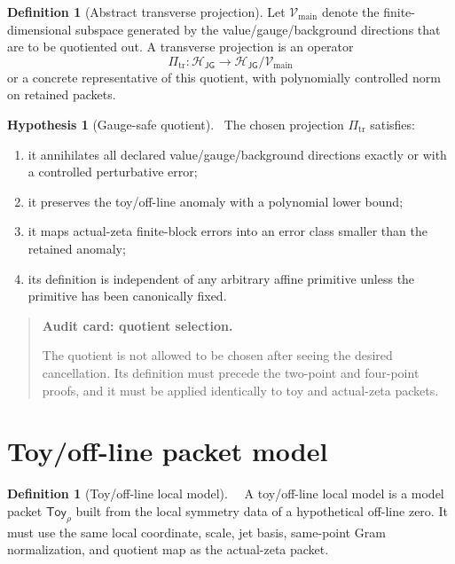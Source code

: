 \documentclass[11pt,a4paper]{amsart}
\newcommand{\Status}[1]{\textnormal{\fbox{\scriptsize\textsf{#1}}}}
\newcommand{\Core}{\Status{CORE}}
\newcommand{\Open}{\Status{OPEN}}
\newcommand{\JG}{\mathsf{JG}}
\newcommand{\Toy}{\mathsf{Toy}}
\newcommand{\trans}{\mathrm{tr}}
\newcommand{\main}{\mathrm{main}}
\theoremstyle{plain}
\theoremstyle{definition}
\newtheorem{definition}[theorem]{Definition}
\newtheorem{hypothesis}[theorem]{Hypothesis}
\newenvironment{audit}[1]{%
  \begin{quote}\noindent\textbf{Audit card: #1.}\par\smallskip\small
}{\end{quote}}
\begin{document}
\begin{definition}[Abstract transverse projection]
\label{def:abstract-transverse-projection}
Let \(\mathcal V_{\main}\) denote the finite-dimensional subspace generated by the value/gauge/background directions that are to be quotiented out.  A transverse projection is an operator
\[
        \Pi_{\trans}:\mathcal H_{\JG}\to \mathcal H_{\JG}/\mathcal V_{\main}
\]
or a concrete representative of this quotient, with polynomially controlled norm on retained packets.
\end{definition}

\begin{hypothesis}[Gauge-safe quotient]
\label{hyp:gauge-safe-quotient}
\Open\
The chosen projection \(\Pi_{\trans}\) satisfies:
\begin{enumerate}[label=\textup{Q\arabic*.},leftmargin=*]
\item it annihilates all declared value/gauge/background directions exactly or with a controlled perturbative error;
\item it preserves the toy/off-line anomaly with a polynomial lower bound;
\item it maps actual-zeta finite-block errors into an error class smaller than the retained anomaly;
\item its definition is independent of any arbitrary affine primitive unless the primitive has been canonically fixed.
\end{enumerate}
\end{hypothesis}

\begin{audit}{quotient selection}
The quotient is not allowed to be chosen after seeing the desired cancellation.  Its definition must precede the two-point and four-point proofs, and it must be applied identically to toy and actual-zeta packets.
\end{audit}

\section{Toy/off-line packet model}
\label{sec:toy-offline-packet-model}

\begin{definition}[Toy/off-line local model]
\label{def:toy-offline-model}
\Core\ \Open\
A toy/off-line local model is a model packet \(\Toy_\rho\) built from the local symmetry data of a hypothetical off-line zero.  It must use the same local coordinate, scale, jet basis, same-point Gram normalization, and quotient map as the actual-zeta packet.
\end{definition}
\end{document}
